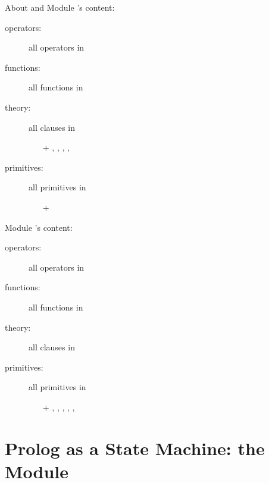 \documentclass[handout]{beamer}
\begin{document}
\begin{frame}[allowframebreaks]{About  and }
    Module \alert{}'s  content:
    \begin{description}
        \item[operators:] all operators in 
        \item[functions:] all functions in  
        \item[theory:] all clauses in   
        \begin{itemize}
            \item[+] , , , , 
        \end{itemize}  
        \item[primitives:] all primitives in 
        \begin{itemize}
            \item[+] 
        \end{itemize}   
    \end{description}

    \framebreak

    Module \alert{}'s  content:
    \begin{description}
        \item[operators:] all operators in 
        \item[functions:] all functions in  
        \item[theory:] all clauses in   
        \item[primitives:] all primitives in 
        \begin{itemize}
            \item[+] , , , , , 
        \end{itemize}   
    \end{description}
\end{frame}

\section{Prolog as a State Machine: the  Module}
\end{document}
